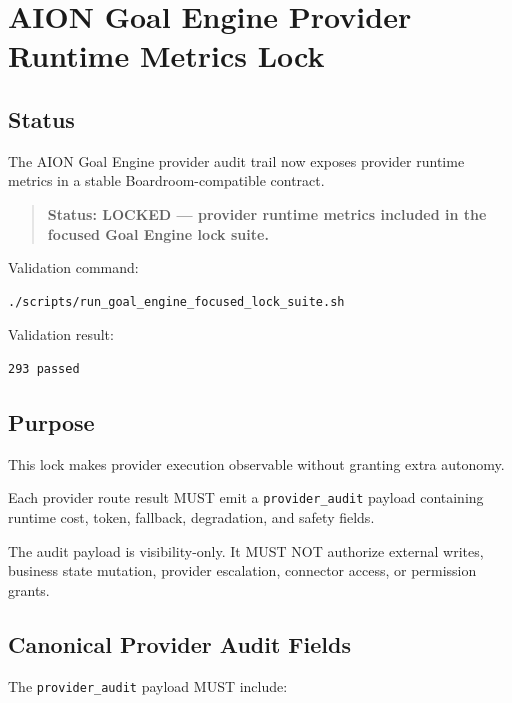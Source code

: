 \section{AION Goal Engine Provider Runtime Metrics Lock}
\label{sec:aion-goal-engine-provider-runtime-metrics-lock}

\subsection{Status}

The AION Goal Engine provider audit trail now exposes provider runtime metrics in a stable Boardroom-compatible contract.

\begin{quote}
\textbf{Status: LOCKED --- provider runtime metrics included in the focused Goal Engine lock suite.}
\end{quote}

Validation command:

\begin{verbatim}
./scripts/run_goal_engine_focused_lock_suite.sh
\end{verbatim}

Validation result:

\begin{verbatim}
293 passed
\end{verbatim}

\subsection{Purpose}

This lock makes provider execution observable without granting extra autonomy.

Each provider route result MUST emit a \texttt{provider\_audit} payload containing runtime cost, token, fallback, degradation, and safety fields.

The audit payload is visibility-only. It MUST NOT authorize external writes, business state mutation, provider escalation, connector access, or permission grants.

\subsection{Canonical Provider Audit Fields}

The \texttt{provider\_audit} payload MUST include:

